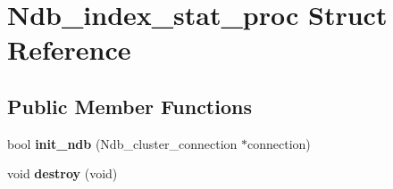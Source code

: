 \hypertarget{structNdb__index__stat__proc}{}\section{Ndb\+\_\+index\+\_\+stat\+\_\+proc Struct Reference}
\label{structNdb__index__stat__proc}
\subsection*{Public Member Functions}
\begin{DoxyCompactItemize}
\item 
\mbox{\label{structNdb__index__stat__proc_af3b55f498986b6f17da713f7557599d0}} 
bool {\bfseries init\+\_\+ndb} (Ndb\+\_\+cluster\+\_\+connection $\ast$connection)
\item 
\mbox{\label{structNdb__index__stat__proc_af0f0162a6aa7e364d3f4340ecb8fd163}} 
void {\bfseries destroy} (void)
\end{DoxyCompactItemize}
